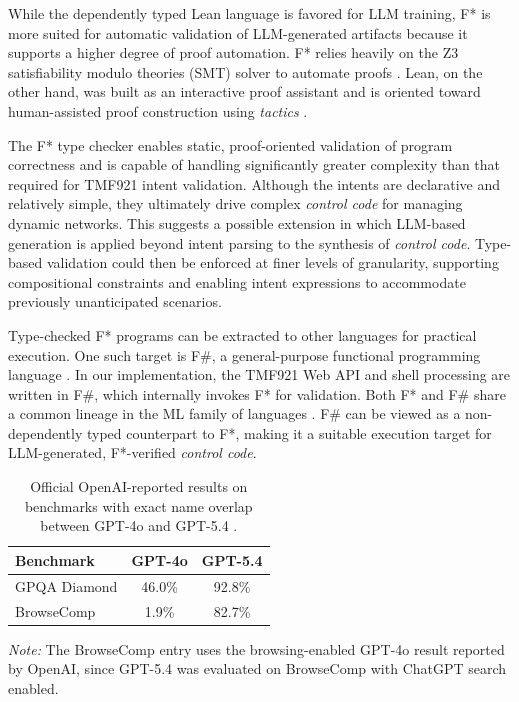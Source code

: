 \documentclass[conference]{IEEEtran}
\begin{document}
While the dependently typed Lean language \cite{mathematics_in_lean,lean4_theorem_prover} is favored for LLM training, F* is more suited for automatic validation of LLM-generated artifacts because it supports a higher degree of proof automation. F* relies heavily on the Z3 satisfiability modulo theories (SMT) solver to automate proofs \cite{fstar_popl,z3_smt_solver,smt_barrett_tinelli}. Lean, on the other hand, was built as an interactive proof assistant and is oriented toward human-assisted proof construction using \textit{tactics} \cite{lean4_theorem_prover,lean_tactic_reference}.

The F* type checker enables static, proof-oriented validation of program correctness and is capable of handling significantly greater complexity than that required for TMF921 intent validation. Although the intents are declarative and relatively simple, they ultimately drive complex \textit{control code} for managing dynamic networks. This suggests a possible extension in which LLM-based generation is applied beyond intent parsing to the synthesis of \textit{control code}. Type-based validation could then be enforced at finer levels of granularity, supporting compositional constraints and enabling intent expressions to accommodate previously unanticipated scenarios.

Type-checked F* programs can be extracted to other languages for practical execution. One such target is F\#, a general-purpose functional programming language \cite{fsharp}. In our implementation, the TMF921 Web API and shell processing are written in F\#, which internally invokes F* for validation. Both F* and F\# share a common lineage in the ML family of languages \cite{milner_ml_polymorphism}. F\# can be viewed as a non-dependently typed counterpart to F*, making it a suitable execution target for LLM-generated, F*-verified \textit{control code}.

\begin{table}[t]
\centering
\caption{Official OpenAI-reported results on benchmarks with exact name overlap between GPT-4o and GPT-5.4 \cite{gpt54_openai,gpt41_openai,browsecomp_openai}.}
\label{tab:gpt54-gpt4o}
\begin{tabular}{lcc}
\hline
Benchmark & GPT-4o & GPT-5.4 \\
\hline
GPQA Diamond & 46.0\% & 92.8\% \\
BrowseComp & 1.9\% & 82.7\% \\
\hline
\end{tabular}

\parbox{0.95\linewidth}{\footnotesize \textit{Note:} The BrowseComp entry uses the browsing-enabled GPT-4o result reported by OpenAI, since GPT-5.4 was evaluated on BrowseComp with ChatGPT search enabled.}
\end{table}
\end{document}
